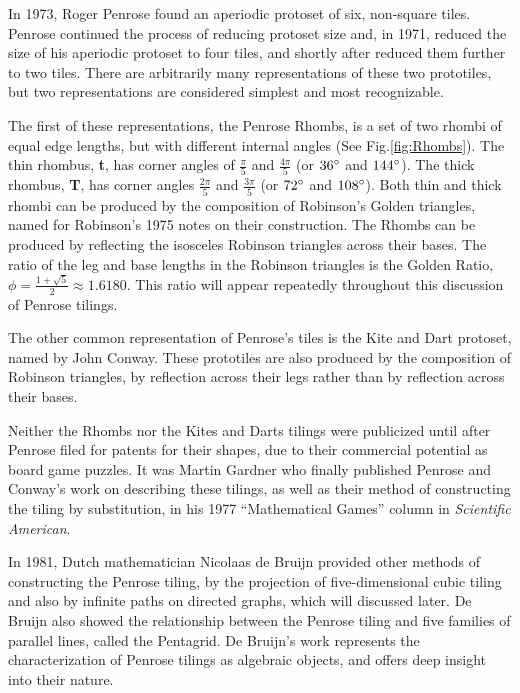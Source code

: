 \documentclass[
  oneside,
  11pt, a4paper,
  footinclude=true,
  headinclude=true,
  cleardoublepage=empty
]{scrbook}
\begin{document}
In 1973, Roger Penrose found an aperiodic protoset of six, non-square tiles.  Penrose continued the process of reducing protoset size and, in 1971, reduced the size of his aperiodic protoset to four tiles, and shortly after reduced them further to two tiles. There are arbitrarily many representations of these two prototiles, but two representations are considered simplest and most recognizable. 

The first of these representations, the Penrose Rhombs, is a set of two rhombi of equal edge lengths, but with different internal angles (See Fig.\ref{fig:Rhombs}). The thin rhombus, \textbf{t}, has corner angles of $\frac{\pi}{5}$ and $\frac{4 \pi}{5}$ (or $36 \degree$ and $144 \degree$). The thick rhombus, \textbf{T}, has corner angles  $\frac{2 \pi}{5}$ and $\frac{3 \pi}{5}$ (or $72 \degree$ and $108 \degree$). Both thin and thick rhombi can be produced by the composition of Robinson's Golden triangles, named for Robinson's 1975 notes on their construction. The Rhombs can be produced by reflecting the isosceles Robinson triangles across their bases. The ratio of the leg and base lengths in the Robinson triangles is the Golden Ratio, \textbf{ $\phi= \frac{1+\sqrt{5}}{2}\approx 1.6180$}. This ratio will appear repeatedly throughout this discussion of Penrose tilings. 

The other common representation of Penrose's tiles is the Kite and Dart protoset, named by John Conway. These prototiles are also produced by the composition of Robinson triangles, by reflection across their legs rather than by reflection across their bases. 

Neither the Rhombs nor the Kites and Darts tilings were publicized until after Penrose filed for patents for their shapes, due to their commercial potential as board game puzzles. It was Martin Gardner who finally published Penrose and Conway's work on describing these tilings, as well as their method of constructing the tiling by substitution, in his 1977 ``Mathematical Games'' column in \textit{Scientific American}. 

In 1981, Dutch mathematician Nicolaas de Bruijn provided other methods of constructing the Penrose tiling, by the projection of five-dimensional cubic tiling and also by infinite paths on directed graphs, which will discussed later. De Bruijn also showed the relationship between the Penrose tiling and five families of parallel lines, called the Pentagrid. De Bruijn's work represents the characterization of Penrose tilings as algebraic objects, and offers deep insight into their nature. 
\end{document}
